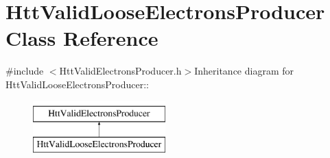 \hypertarget{classHttValidLooseElectronsProducer}{
\section{HttValidLooseElectronsProducer Class Reference}
\label{classHttValidLooseElectronsProducer}
}


{\ttfamily \#include $<$HttValidElectronsProducer.h$>$}Inheritance diagram for HttValidLooseElectronsProducer::\begin{figure}[H]
\begin{center}
\leavevmode
\includegraphics[height=2cm]{classHttValidLooseElectronsProducer}
\end{center}
\end{figure}
